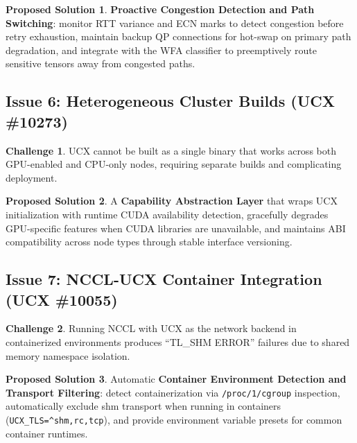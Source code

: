 \documentclass[11pt,letterpaper]{article}
\theoremstyle{definition}
\newtheorem{challenge}{Challenge}
\newtheorem{solution}{Proposed Solution}
\begin{document}
\begin{solution}
\textbf{Proactive Congestion Detection and Path Switching}: monitor RTT variance and ECN marks to detect congestion before retry exhaustion, maintain backup QP connections for hot-swap on primary path degradation, and integrate with the WFA classifier to preemptively route sensitive tensors away from congested paths.
\end{solution}

\subsection{Issue 6: Heterogeneous Cluster Builds (UCX \#10273)}

\begin{challenge}
UCX cannot be built as a single binary that works across both GPU-enabled and CPU-only nodes, requiring separate builds and complicating deployment.
\end{challenge}

\begin{solution}
A \textbf{Capability Abstraction Layer} that wraps UCX initialization with runtime CUDA availability detection, gracefully degrades GPU-specific features when CUDA libraries are unavailable, and maintains ABI compatibility across node types through stable interface versioning.
\end{solution}

\subsection{Issue 7: NCCL-UCX Container Integration (UCX \#10055)}

\begin{challenge}
Running NCCL with UCX as the network backend in containerized environments produces ``TL\_SHM ERROR'' failures due to shared memory namespace isolation.
\end{challenge}

\begin{solution}
Automatic \textbf{Container Environment Detection and Transport Filtering}: detect containerization via \texttt{/proc/1/cgroup} inspection, automatically exclude shm transport when running in containers (\texttt{UCX\_TLS=\textasciicircum shm,rc,tcp}), and provide environment variable presets for common container runtimes.
\end{solution}

\end{document}
